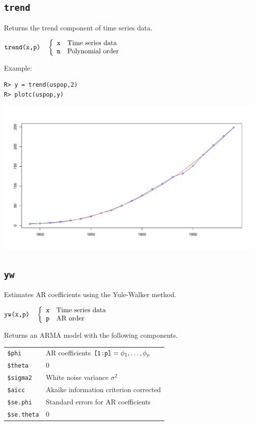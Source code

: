 \documentclass[11pt]{article}
\begin{document}
\newpage

\subsection{\tt trend}
Returns the trend component of time series data.

\bigskip
$
\hbox{\tt trend(x,p)}\quad\left\{\begin{array}{ll}
{\tt x} & \hbox{Time series data}\\
{\tt n} & \hbox{Polynomial order}\\
\end{array}\right.
$

\bigskip
\noindent
Example:
\begin{verbatim}
R> y = trend(uspop,2)
R> plotc(uspop,y)
\end{verbatim}

\begin{center}
\includegraphics[scale=0.3]{Rplot-3.pdf}
\end{center}

\newpage

\subsection{\tt yw}
Estimates AR coefficients using the Yule-Walker method.

\bigskip
$
\hbox{\tt yw(x,p)}\quad\left\{\begin{array}{ll}
{\tt x} & \hbox{Time series data}\\
{\tt p} & \hbox{AR order}
\end{array}\right.
$

\bigskip
\noindent
Returns an ARMA model with the following components.

\begin{center}
\begin{tabular}{ll}
{\tt \$phi} & AR coefficients $\hbox{\tt[1:p]}=\phi_1,\ldots,\phi_p$\\
{\tt \$theta} & 0\\
{\tt \$sigma2} & White noise variance $\sigma^2$\\
{\tt \$aicc} & Akaike information criterion corrected\\
{\tt \$se.phi} & Standard errors for AR coefficients\\
{\tt \$se.theta} & 0
\end{tabular}
\end{center}
\end{document}
